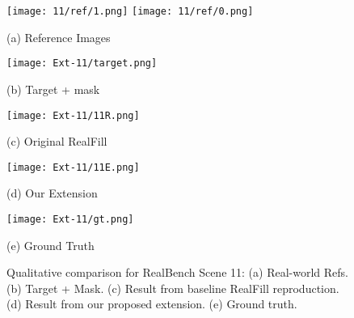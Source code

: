 \documentclass{article}
\begin{document}
\begin{figure}[H]
    \centering
    \begin{minipage}[b]{0.19\textwidth}
        \centering
        \texttt{[image: 11/ref/1.png]}
        \texttt{[image: 11/ref/0.png]}
        \caption*{(a) Reference Images}
    \end{minipage}\hfill%
    \begin{minipage}[b]{0.19\textwidth}
        \centering
        \texttt{[image: Ext-11/target.png]}
        \caption*{(b) Target + mask}
    \end{minipage}\hfill%
    \begin{minipage}[b]{0.19\textwidth}
        \centering
        \texttt{[image: Ext-11/11R.png]}
        \caption*{(c) Original RealFill}
    \end{minipage}\hfill%
    \begin{minipage}[b]{0.19\textwidth}
        \centering
        \texttt{[image: Ext-11/11E.png]}
        \caption*{(d) Our Extension}
    \end{minipage}\hfill%
    \begin{minipage}[b]{0.19\textwidth}
        \centering
        \texttt{[image: Ext-11/gt.png]}
        \caption*{(e) Ground Truth}
    \end{minipage}
    \caption{Qualitative comparison for RealBench Scene 11: (a) Real-world Refs. (b) Target + Mask. (c) Result from baseline RealFill reproduction. (d) Result from our proposed extension. (e) Ground truth.}
\end{figure}
\end{document}
